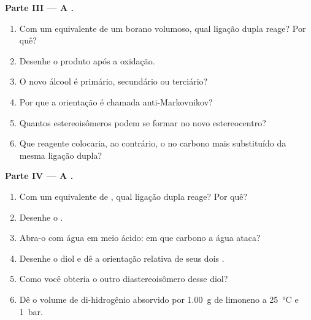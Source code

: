 \begin{problem}
\medskip
\noindent\textbf{Parte III --- A .}
\begin{enumerate}[resume]
  \item Com um equivalente de um borano volumoso, qual ligação dupla reage? Por quê?
  \item Desenhe o produto após a oxidação.
  \item O novo álcool é primário, secundário ou terciário?
  \item Por que a orientação é chamada anti-Markovnikov?
  \item Quantos estereoisômeros podem se formar no novo estereocentro?
  \item Que reagente colocaria, ao contrário, o  no carbono mais
        substituído da mesma ligação dupla?
\end{enumerate}

\medskip
\noindent\textbf{Parte IV --- A .}
\begin{enumerate}[resume]
  \item Com um equivalente de , qual ligação dupla reage? Por quê?
  \item Desenhe o .
  \item Abra-o com água em meio ácido: em que carbono a água ataca?
  \item Desenhe o diol e dê a orientação relativa de seus dois .
  \item Como você obteria o outro diastereoisômero desse diol?
  \item Dê o volume de di-hidrogênio absorvido por \qty{1.00}{g} de limoneno a
        \qty{25}{\degreeCelsius} e \qty{1}{bar}.
\end{enumerate}
\end{problem}
